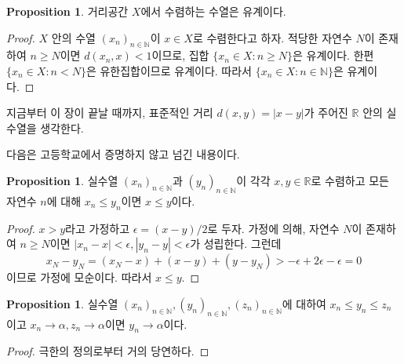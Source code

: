 \documentclass[11pt]{book}
\numberwithin{equation}{chapter}
\def\NN{\mathbb{N}}
\def\RR{\mathbb{R}}
\def\eps{\epsilon}
\newcommand{\abs}[1]{\left\vert#1\right\vert}
\theoremstyle{definition}
\newtheorem{prop}[thm]{Proposition}
\begin{document}
    \begin{prop}
        거리공간 \(X\)에서 수렴하는 수열은 유계이다.
    \end{prop}
    \begin{proof}
        \(X\) 안의 수열 \((x_n)_{n \in \NN}\)이 \(x \in X\)로 수렴한다고 하자. 적당한 자연수 \(N\)이 존재하여 \(n \ge N\)이면 \(d(x_n, x) < 1\)이므로, 집합 \(\{x_n \in X : n \ge N\}\)은 유계이다. 한편 \(\{x_n \in X : n < N\}\)은 유한집합이므로 유계이다. 따라서 \(\{x_n \in X : n \in \NN\}\)은 유계이다.
    \end{proof}

지금부터 이 장이 끝날 때까지, 표준적인 거리 \(d(x, y) = \abs{x - y}\)가 주어진 \(\RR\) 안의 실수열을 생각한다.

다음은 고등학교에서 증명하지 않고 넘긴 내용이다.

    \begin{prop}
        실수열 \((x_n)_{n \in \NN}\)과 \((y_n)_{n \in \NN}\)이 각각 \(x, y \in \RR\)로 수렴하고 모든 자연수 \(n\)에 대해 \(x_n \le y_n\)이면 \(x \le y\)이다.
    \end{prop}
    \begin{proof}
        \(x > y\)라고 가정하고 \(\eps = (x - y) / 2\)로 두자. 가정에 의해, 자연수 \(N\)이 존재하여 \(n \ge N\)이면 \(\abs{x_n - x} < \eps, \abs{y_n - y} < \eps\)가 성립한다. 그런데
        \[
        x_N - y_N = (x_N - x) + (x- y) + (y - y_N) > -\eps + 2\eps -\eps = 0
        \]
        이므로 가정에 모순이다. 따라서 \(x \le y\).
    \end{proof}

    \begin{prop}
        실수열 \((x_n)_{n \in \NN}, (y_n)_{n \in \NN}, (z_n)_{n \in \NN}\)에 대하여 \(x_n \le y_n \le z_n\)이고 \(x_n \to \alpha, z_n \to \alpha\)이면 \(y_n \to \alpha\)이다.
    \end{prop}
    \begin{proof}
        극한의 정의로부터 거의 당연하다.
    \end{proof}
\end{document}
